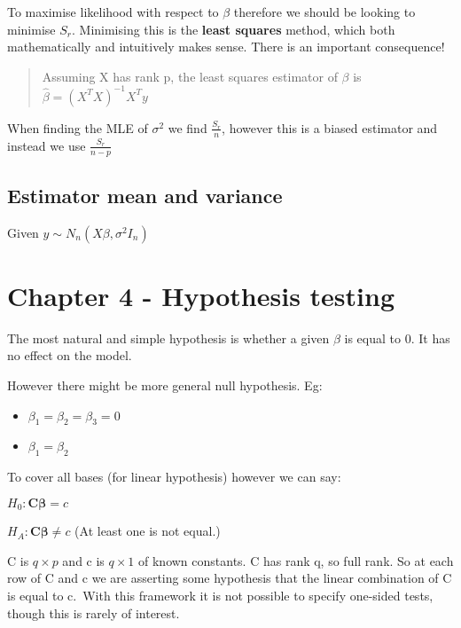 \documentclass[
  letterpaper,
  DIV=11,
  numbers=noendperiod]{scrreprt}
\providecommand{\tightlist}{%
  \setlength{\itemsep}{0pt}\setlength{\parskip}{0pt}}\usepackage{longtable,booktabs,array}
\begin{document}
To maximise likelihood with respect to \(\beta\) therefore we should be
looking to minimise \(S_r\). Minimising this is the \textbf{least
squares} method, which both mathematically and intuitively makes sense.
There is an important consequence!

\begin{quote}
Assuming X has rank p, the least squares estimator of \(\beta\) is
\(\hat{\beta} = (X^TX)^{-1}X^Ty\)
\end{quote}

When finding the MLE of \(\sigma^2\) we find \(\frac{S_r}{n}\), however
this is a biased estimator and instead we use \(\frac{S_r}{n-p}\)

\hypertarget{estimator-mean-and-variance}{%
\subsection{Estimator mean and
variance}\label{estimator-mean-and-variance}}

Given \(y \sim N_n(X\beta, \sigma^2I_n)\)

\hypertarget{chapter-4---hypothesis-testing}{%
\section{Chapter 4 - Hypothesis
testing}\label{chapter-4---hypothesis-testing}}

The most natural and simple hypothesis is whether a given \(\beta\) is
equal to 0. It has no effect on the model.

However there might be more general null hypothesis. Eg:

\begin{itemize}
\tightlist
\item
  \(\beta_1 = \beta_2 = \beta_3 = 0\)
\item
  \(\beta_1 = \beta_2\)
\end{itemize}

To cover all bases (for linear hypothesis) however we can say:

\(H_0 : \boldsymbol{C\beta} = c\)

\(H_A : \boldsymbol{C\beta} \neq c\) (At least one is not equal.)

C is \(q \times p\) and c is \(q \times 1\) of known constants. C has
rank q, so full rank. So at each row of C and c we are asserting some
hypothesis that the linear combination of C is equal to c.~With this
framework it is not possible to specify one-sided tests, though this is
rarely of interest.
\end{document}
